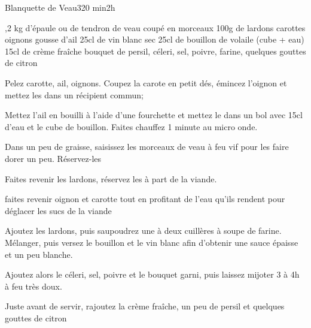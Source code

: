 \begin{recette}{Blanquette de Veau}{3}{20 min}{2h}
\begin{ingredients}
,2 kg d'épaule ou de tendron de veau coupé en morceaux
\ingredient 100g de lardons
 carottes
 oignons
 gousse d'ail
\ingredient 25cl de vin blanc sec
\ingredient 25cl de bouillon de volaile (cube + eau)
\ingredient 15cl de crème fraîche
 bouquet de persil, céleri, sel, poivre, farine, quelques gouttes de citron
\end{ingredients}

\begin{preparation}
\etape Pelez carotte, ail, oignons. Coupez la carote en petit dés, émincez l'oignon et mettez les dans un récipient commun;

\etape Mettez l'ail en bouilli à l'aide d'une fourchette et mettez le dans un bol avec 15cl d'eau et le cube de bouillon. 
Faites chauffez 1 minute au micro onde.

\etape Dans un peu de graisse, saisissez les morceaux de veau à feu vif pour les faire dorer un peu. Réservez-les

\etape Faites revenir les lardons, réservez les à part de la viande. 

\etape faites revenir oignon et carotte tout en profitant de l'eau qu'ils rendent pour déglacer les sucs de la viande

\etape Ajoutez les lardons, puis saupoudrez une à deux cuillères à soupe de farine. Mélanger, puis versez le bouillon et le vin 
blanc afin d'obtenir une sauce épaisse et un peu blanche. 

\etape Ajoutez alors le céleri, sel, poivre et le bouquet garni, puis laissez mijoter 3 à 4h à feu très doux. 

\etape Juste avant de servir, rajoutez la crème fraîche, un peu de persil et quelques gouttes de citron
\end{preparation}
\end{recette}


